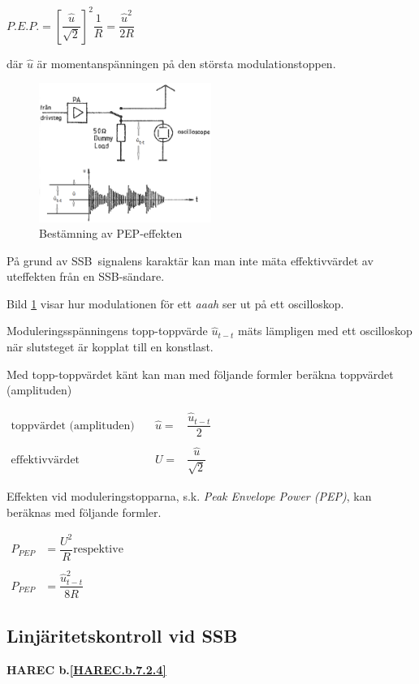 \(P.E.P. = \left[\dfrac{\hat{u}}{\sqrt{2}}\right]^2\dfrac{1}{R} =  \dfrac{\hat{u}^2}{2R}\)

där \(\hat{u}\) är momentanspänningen på den största modulationstoppen.

\begin{figure}
	\includegraphics[width=0.5\textwidth]{images/cropped_pdfs/bild_2_3-52.pdf}
	\caption{Bestämning av PEP-effekten}
	\label{fig:BildII3-52}
\end{figure}

På grund av SSB~signalens karaktär kan man inte mäta effektivvärdet av
uteffekten från en SSB-sändare.

Bild \ref{fig:BildII3-52} visar hur modulationen för ett \emph{aaah} ser ut
på ett oscilloskop.

Moduleringsspänningens topp-topp\-värde \(\hat{u}_{t-t}\) mäts lämpligen med ett
oscilloskop när slutsteget är kopplat till en konstlast.

Med topp-toppvärdet känt kan man med följande formler beräkna
toppvärdet (amplituden)

\(
\begin{array}{lll}
\text{toppvärdet (amplituden)} &  \quad \hat{u}= & \dfrac{\hat{u}_{t-t}}{2}\\
& & \\
\text{effektivvärdet} &\quad  U =& \dfrac{\hat{u}}{\sqrt{2}}
\end{array}
\)

Effekten vid moduleringstopparna, s.k. \emph{Peak Envelope Power (PEP)}, kan
beräknas med följande formler.

\(
\begin{array}{ll}
P_{PEP} & = \dfrac{U^2}{R} \text{respektive} \\
&\\
P_{PEP} & = \dfrac{\hat{u}_{t-t}^2}{8R}
\end{array}
\)

\subsection{Linjäritetskontroll vid SSB}
\textbf{HAREC
  b.\ref{HAREC.b.7.2.4}\label{myHAREC.b.7.2.4}
}

